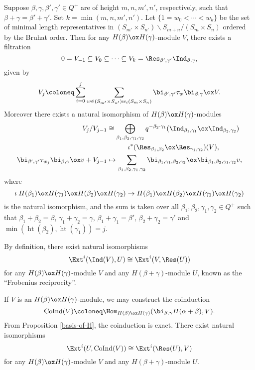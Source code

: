 \begin{proposition}\label{mackey}
    Suppose $\beta,\gamma,\beta',\gamma'\in Q^+$ are of height $m,n,m',n'$,
    respectively, such that $\beta+\gamma = \beta'+\gamma'$. Set
    $k = \min(m,n,m',n')$. Let $\{1 = w_0<\cdots<w_k\}$ be the set of minimal
    length representatives in 
    $(S_{m'}\times S_{n'})\backslash S_{m+n}/(S_m\times S_n)$ ordered by
    the Bruhat order. Then for any $H(\beta)\ox H(\gamma)$-module $V$,
    there exists a filtration $$0 = V_{-1}\subseteq V_0\subseteq \cdots
    \subseteq V_k = \Res_{\beta',\gamma'}\Ind_{\beta,\gamma},$$ given by
    $$V_j \coloneq  \sum_{i = 0}^j\sum_{w\in(S_{m'}\times S_{n'})w_i(S_m\times S_n)}
    \bi_{\beta',\gamma'}\tau_w\bi_{\beta,\gamma}\ox V.$$ Moreover there exists
    a natural isomorphism of $H(\beta)\ox H(\gamma)$-modules
    \[
        \begin{aligned}
            V_j/V_{j-1}&\cong\bigoplus_{\beta_1,\beta_2,\gamma_1,\gamma_2}
            q^{-\beta_2\cdot\gamma_1}(\Ind_{\beta_1,\gamma_1}\ox\Ind_{\beta_2,\gamma_2})
            \\&\hspace{3em}\iota^*(\Res_{\beta_1,\beta_2}\ox\Res_{\gamma_1,\gamma_2})(V),\\
            \bi_{\beta',\gamma'}\tau_{w_j}\bi_{\beta,\gamma}\ox v+V_{j-1}&
        \mapsto\sum_{\beta_1,\beta_2,\gamma_1,\gamma_2}
        \bi_{\beta_1,\gamma_1,\beta_2,\gamma_2}\ox
        \bi_{\beta_1,\beta_2,\gamma_1,\gamma_2}v,
        \end{aligned}
    \]
    where $$\iota\:H(\beta_1)\ox H(\gamma_1)\ox H(\beta_2)\ox H(\gamma_2)
    \to H(\beta_1)\ox H(\beta_2)\ox H(\gamma_1)\ox H(\gamma_2)$$ is the
    natural isomorphism, and the sum is taken over all 
    $\beta_1,\beta_2,\gamma_1,\gamma_2\in Q^+$ such that $\beta_1+\beta_2 = \beta$,
    $\gamma_1+\gamma_2 = \gamma$, $\beta_1+\gamma_1 = \beta'$,
    $\beta_2+\gamma_2 = \gamma'$ and $\min(\operatorname{ht}(\beta_2),
    \operatorname{ht}(\gamma_1)) = j$.
\end{proposition}

By definition, there exist natural isomorphisms $$\Ext^i(\Ind(V),U)\cong
\Ext^i(V,\Res(U))$$ for any $H(\beta)\ox H(\gamma)$-module $V$ and 
any $H(\beta+\gamma)$-module $U$, known as the ``Frobenius reciprocity''.

If $V$ is an 
$H(\beta)\ox H(\gamma)$-module, we may construct the coinduction
\[
    \operatorname{CoInd}(V) \coloneq  \Hom_{H(\beta)\ox H(\gamma)}
    (\bi_{\beta,\gamma}H(\alpha+\beta),V).
\] 
From Proposition \ref{basis-of-H},
the coinduction is exact. There exist natural isomorphisms
\[
    \Ext^i(U,\operatorname{CoInd}(V))\cong
    \Ext^i(\Res(U),V)
\] 
for any $H(\beta)\ox H(\gamma)$-module $V$ and 
any $H(\beta+\gamma)$-module $U$. 

